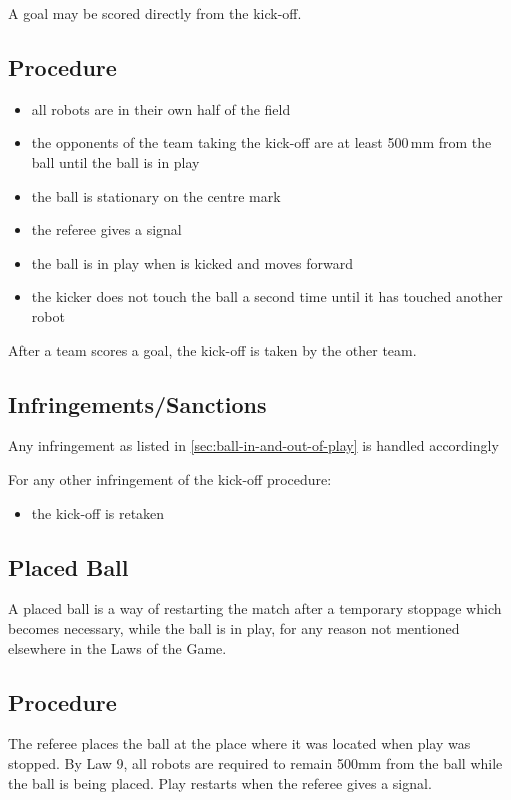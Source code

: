 A goal may be scored directly from the kick-off.

\subsection{Procedure}
\begin{itemize}
\item all robots are in their own half of the field
\item the opponents of the team taking the kick-off are at least 500\,mm from the ball until the ball is in play
\item the ball is stationary on the centre mark
\item the referee gives a signal
\item the ball is in play when is kicked and moves forward
\item the kicker does not touch the ball a second time until it has touched another robot
\end{itemize}

After a team scores a goal, the kick-off is taken by the other team.

\subsection{Infringements/Sanctions}
Any infringement as listed in \autoref{sec:ball-in-and-out-of-play} is handled accordingly

For any other infringement of the kick-off procedure:
\begin{itemize}
\item the kick-off is retaken
\end{itemize}

\subsection{Placed Ball}
A placed ball is a way of restarting the match after a temporary stoppage which becomes necessary, while the ball is in play, for any reason not mentioned elsewhere in the Laws of the Game.

\subsection{Procedure}
The referee places the ball at the place where it was located when play was stopped.
By Law 9, all robots are required to remain 500\added{\,}mm from the ball while the ball is being placed.
Play restarts when the referee gives a signal.

